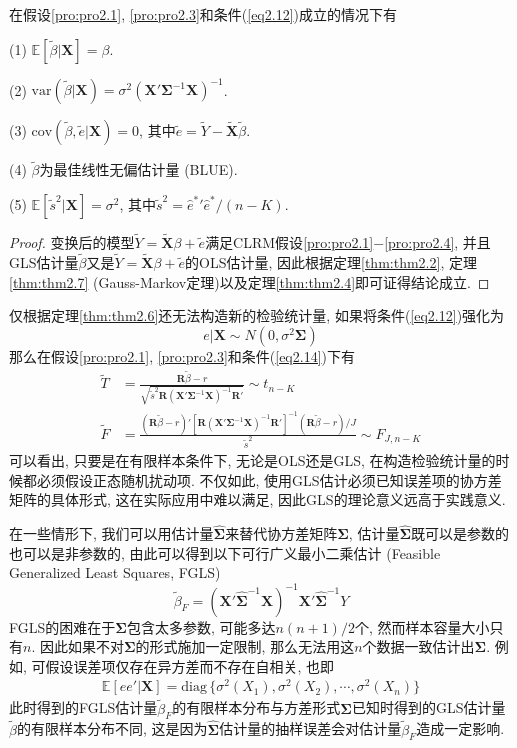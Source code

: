 \documentclass[cn, 12pt, math=mtpro2, bibstyle=apa, blue, twocol]{elegantbook}
\newcommand{\RH}{\mathbold{R}}
\newcommand{\E}{\mathbb{E}}
\newcommand{\var}{\text{var}}
\newcommand{\X}{\mathbold{X}}
\newcommand{\BS}{\mathbold{\Sigma}}
\begin{document}
\begin{theorem}\label{thm:thm2.6}
  在假设\ref{pro:pro2.1}, \ref{pro:pro2.3}和条件(\ref{eq2.12})成立的情况下有

  (1) $\E[\tilde{\beta}|\X]=\beta$.

  (2) $\var(\tilde{\beta}|\X)=\sigma^2(\X'\mathbold{\Sigma}^{-1}\X)^{-1}$.

  (3) $\text{cov}(\tilde{\beta},\tilde{e}|\X)=0$, 其中$\tilde{e}=\tilde{Y}-\tilde{\X}\tilde{\beta}$.

  (4) $\tilde{\beta}$为最佳线性无偏估计量 (BLUE).

  (5) $\E[\tilde{s}^2|\X]=\sigma^2$, 其中$\tilde{s}^2=\hat{e}^{\ast}{'}\hat{e}^{\ast}/(n-K)$.
\end{theorem}
\begin{proof}
  变换后的模型$\tilde{Y}=\tilde{\X}\beta+\tilde{e}$满足CLRM假设\ref{pro:pro2.1}$-$\ref{pro:pro2.4}, 并且GLS估计量$\tilde{\beta}$又是$\tilde{Y}=\tilde{\X}\beta+\tilde{e}$的OLS估计量, 因此根据定理\ref{thm:thm2.2}, 定理\ref{thm:thm2.7} (Gauss-Markov定理)以及定理\ref{thm:thm2.4}即可证得结论成立.
\end{proof}
仅根据定理\ref{thm:thm2.6}还无法构造新的检验统计量, 如果将条件(\ref{eq2.12})强化为
\begin{equation}\label{eq2.14}
  e|\X\sim N(0,\sigma^2\mathbold{\Sigma})
\end{equation}
那么在假设\ref{pro:pro2.1}, \ref{pro:pro2.3}和条件(\ref{eq2.14})下有
\begin{align*}
\tilde{T}&=\frac{\RH\tilde{\beta}-r}{\sqrt{\tilde{s}^2\RH(\X'\mathbold{\Sigma}^{-1}\X)^{-1}\RH'}}\sim t_{n-K} \\
\tilde{F}&=\frac{(\RH\tilde{\beta}-r)'[\RH(\X'\mathbold{\Sigma}^{-1}\X)^{-1}\RH']^{-1}(\RH\tilde{\beta}-r)/J}{\tilde{s}^2}\sim F_{J,n-K}
\end{align*}
可以看出, 只要是在有限样本条件下, 无论是OLS还是GLS, 在构造检验统计量的时候都必须假设正态随机扰动项. 不仅如此, 使用GLS估计必须已知误差项的协方差矩阵的具体形式, 这在实际应用中难以满足, 因此GLS的理论意义远高于实践意义.

在一些情形下, 我们可以用估计量$\hat{\mathbold{\Sigma}}$来替代协方差矩阵$\mathbold{\Sigma}$, 估计量$\hat{\BS}$既可以是参数的也可以是非参数的, 由此可以得到以下可行广义最小二乘估计 (Feasible Generalized Least Squares, FGLS)
$$\tilde{\beta}_F=(\X'\hat{\mathbold{\Sigma}}^{-1}\X)^{-1}\X'\hat{\mathbold{\Sigma}}^{-1}Y$$
FGLS的困难在于$\mathbold{\Sigma}$包含太多参数, 可能多达$n(n+1)/2$个, 然而样本容量大小只有$n$. 因此如果不对$\mathbold{\Sigma}$的形式施加一定限制, 那么无法用这$n$个数据一致估计出$\mathbold{\Sigma}$. 例如, 可假设误差项仅存在异方差而不存在自相关, 也即
\begin{align*}
\E[ee'|\X]=\text{diag}\,\{\sigma^2(X_1),\sigma^2(X_2),\cdots,\sigma^2(X_n)\}
\end{align*}
此时得到的FGLS估计量$\tilde{\beta}_F$的有限样本分布与方差形式$\mathbold{\Sigma}$已知时得到的GLS估计量$\tilde{\beta}$的有限样本分布不同, 这是因为$\hat{\mathbold{\Sigma}}$估计量的抽样误差会对估计量$\tilde{\beta}_F$造成一定影响.
\end{document}
